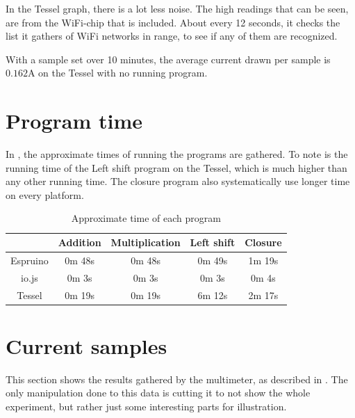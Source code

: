 In the Tessel graph, there is a lot less noise.
The high readings that can be seen, are from the WiFi-chip that is included.
About every 12 seconds, it checks the list it gathers of WiFi networks in range, to see if any of them are recognized.

With a sample set over 10 minutes, the average current drawn per sample is $0.162\si{\ampere}$ on the Tessel with no running program.

\section{Program time}
In , the approximate times of running the programs are gathered.
To note is the running time of the Left shift program on the Tessel, which is much higher than any other running time.
The closure program also systematically use longer time on every platform.
\begin{table}[h]
\centering
\begin{tabular}{ c  c  c  c  c }
 & Addition & Multiplication & Left shift & Closure \\ \midrule
 \rowcolor[gray]{.9}
 Espruino &  0m 48s & 0m 48s & 0m 49s & 1m 19s \\ 
 \rowcolor[gray]{.5}
 io.js  & 0m 3s & 0m 3s & 0m 3s & 0m 4s \\ 
 \rowcolor[gray]{.9}
 Tessel & 0m 19s & 0m 19s & 6m 12s & 2m 17s\\ 
 \bottomrule
\end{tabular}
\caption{Approximate time of each program}
\label{tab:timedruns}
\end{table}



\section{Current samples}
This section shows the results gathered by the multimeter, as described in .
The only manipulation done to this data is cutting it to not show the whole experiment, but rather just some interesting parts for illustration.

